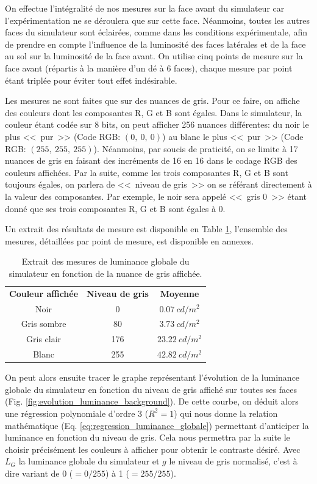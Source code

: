 	\par On effectue l'intégralité de nos mesures sur la face avant du simulateur car l'expérimentation ne se déroulera que sur cette face. Néanmoins, toutes les autres faces du simulateur sont éclairées, comme dans les conditions expérimentale, afin de prendre en compte l'influence de la luminosité des faces latérales et de la face au sol sur la luminosité de la face avant. On utilise cinq points de mesure sur la face avant (répartis à la manière d'un dé à 6 faces), chaque mesure par point étant triplée pour éviter tout effet indésirable.
	
	\par Les mesures ne sont faites que sur des nuances de gris. Pour ce faire, on affiche des couleurs dont les composantes R, G et B sont égales. Dans le simulateur, la couleur étant codée sur 8 bits, on peut afficher 256 nuances différentes: du noir le plus <<~pur~>> (Code RGB: $(0,~0,~0)$) au blanc le plus <<~pur~>> (Code RGB: $(255,~255,~255)$). Néanmoins, par soucis de praticité, on se limite à 17 nuances de gris en faisant des incréments de 16 en 16 dans le codage RGB des couleurs affichées. Par la suite, comme les trois composantes R, G et B sont toujours égales, on parlera de <<~niveau de gris~>> on se référant directement à la valeur des composantes. Par exemple, le noir sera appelé <<~gris 0~>> étant donné que ses trois composantes R, G et B sont égales à 0.
	
	\par Un extrait des résultats de mesure est disponible en Table \ref{tab:extrait_mesure_luminance_fond}, l'ensemble des mesures, détaillées par point de mesure, est disponible en annexes.
	
	\begin{table}[h]	
		\centering
		\caption{Extrait des mesures de luminance globale du simulateur en fonction de la nuance de gris affichée.}
		\label{tab:extrait_mesure_luminance_fond}
		\small
		\begin{tabular}{ccc}
			\textbf{Couleur affichée} & \textbf{Niveau de gris} & \textbf{Moyenne}\\
			Noir & 0 & $0.07~cd/m^2$\\
			Gris sombre & 80 & $3.73~cd/m^2$\\
			Gris clair & 176 & $23.22~cd/m^2$\\
			Blanc & 255 & $42.82~cd/m^2$
		\end{tabular}
	\end{table}
	
	\par On peut alors ensuite tracer le graphe représentant l'évolution de la luminance globale du simulateur en fonction du niveau de gris affiché sur toutes ses faces (Fig. \ref{fig:evolution_luminance_background}). De cette courbe, on déduit alors une régression polynomiale d'ordre 3 ($R^2 = 1$) qui nous donne la relation mathématique (Eq. \ref{eq:regression_luminance_globale}) permettant d'anticiper la luminance en fonction du niveau de gris. Cela nous permettra par la suite le choisir précisément les couleurs à afficher pour obtenir le contraste désiré. Avec $L_G$ la luminance globale du simulateur et $g$ le niveau de gris normalisé, c'est à dire variant de 0 ($= 0/255$) à 1 ($= 255/255$).
	
